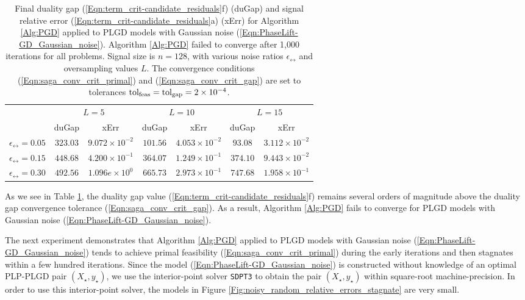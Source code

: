 \begin{table}[H]
\centering
\begin{tabular}{ |c|cc|cc|cc| }
 \hline

 	&	\multicolumn{2}{c|}{$L = 5$}
 		&	\multicolumn{2}{c|}{$L = 10$}
 			&	\multicolumn{2}{c|}{$L = 15$}	\\
 	&	duGap	&	xErr
 		&	duGap	&	xErr
 			&	duGap	&	xErr		\\ 			
 \hline
$\epsilon_\rel = 0.05$
	&	$323.03$ & $9.072 \times 10^{-2}$
		&	$101.56$ & $4.053 \times 10^{-2}$
			&	$93.08$ & $ 3.112 \times 10^{-2}$ \\
$\epsilon_\rel = 0.15$
	&	$448.68$ & $4.200 \times 10^{-1}$
		&	$364.07$ & $1.249 \times 10^{-1}$
			&	$374.10$ & $9.443 \times 10^{-2} $ \\
$\epsilon_\rel = 0.30$
	&	$492.56$ & $1.096e \times 10^{0}$
		&	$665.73$ & $2.973 \times 10^{-1}$
			&	$747.68$ & $1.958 \times 10^{-1}$ \\
 \hline
\end{tabular}
\caption{Final duality gap  (\ref{Eqn:term_crit-candidate_residuals}f) (duGap) and signal relative error (\ref{Eqn:term_crit-candidate_residuals}a) (xErr) for Algorithm \ref{Alg:PGD} applied to PLGD models with Gaussian noise (\ref{Eqn:PhaseLift-GD_Gaussian_noise}).  Algorithm \ref{Alg:PGD} failed to converge after 1,000 iterations for all problems.  Signal size is $n=128$, with various noise ratios $\epsilon_\rel$ and oversampling values $L$.  The convergence conditions (\ref{Eqn:saga_conv_crit_primal}) and (\ref{Eqn:saga_conv_crit_gap}) are set to tolerances $\textnormal{tol}_\textnormal{feas} = \textnormal{tol}_\textnormal{gap} = 2 \times 10^{-4}$.} \label{Tab:Gaussian_dual_variable_stagnates}
\end{table}

As we see in Table \ref{Tab:Gaussian_dual_variable_stagnates}, the duality gap value (\ref{Eqn:term_crit-candidate_residuals}f) remains several orders of magnitude above the duality gap convergence tolerance (\ref{Eqn:saga_conv_crit_gap}).  As a result, Algorithm \ref{Alg:PGD} fails to converge for PLGD models with Gaussian noise (\ref{Eqn:PhaseLift-GD_Gaussian_noise}).  



The next experiment demonstrates that Algorithm \ref{Alg:PGD} applied to PLGD models with Gaussian noise (\ref{Eqn:PhaseLift-GD_Gaussian_noise}) tends to achieve primal feasibility (\ref{Eqn:saga_conv_crit_primal}) during the early iterations and then stagnates within a few hundred iterations.  Since the model (\ref{Eqn:PhaseLift-GD_Gaussian_noise}) is constructed without knowledge of an optimal PLP-PLGD pair $(X_\star, y_\star)$, we use the interior-point solver \texttt{SDPT3} \cite{toh1999sdpt3} to obtain the pair $(X_\star, y_\star)$ within square-root machine-precision.  In order to use this interior-point solver, the models in Figure \ref{Fig:noisy_random_relative_errors_stagnate} are very small.

